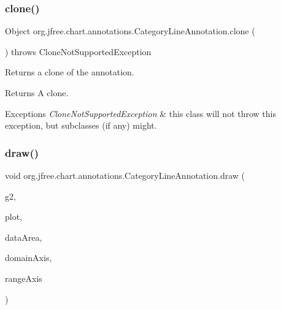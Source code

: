 \subsubsection{\texorpdfstring{clone()}{clone()}}
{\footnotesize\ttfamily Object org.\+jfree.\+chart.\+annotations.\+Category\+Line\+Annotation.\+clone (\begin{DoxyParamCaption}{ }\end{DoxyParamCaption}) throws Clone\+Not\+Supported\+Exception}

Returns a clone of the annotation.

\begin{DoxyReturn}{Returns}
A clone.
\end{DoxyReturn}

\begin{DoxyExceptions}{Exceptions}
{\em Clone\+Not\+Supported\+Exception} & this class will not throw this exception, but subclasses (if any) might. \\
\hline
\end{DoxyExceptions}
\mbox{\label{classorg_1_1jfree_1_1chart_1_1annotations_1_1_category_line_annotation_af5d6ed4dc7fef3a18edf94c0cce35663}} 
\subsubsection{\texorpdfstring{draw()}{draw()}}
{\footnotesize\ttfamily void org.\+jfree.\+chart.\+annotations.\+Category\+Line\+Annotation.\+draw (\begin{DoxyParamCaption}\item[{Graphics2D}]{g2,  }\item[{\mbox{\hyperlink{classorg_1_1jfree_1_1chart_1_1plot_1_1_category_plot}{Category\+Plot}}}]{plot,  }\item[{Rectangle2D}]{data\+Area,  }\item[{\mbox{\hyperlink{classorg_1_1jfree_1_1chart_1_1axis_1_1_category_axis}{Category\+Axis}}}]{domain\+Axis,  }\item[{\mbox{\hyperlink{classorg_1_1jfree_1_1chart_1_1axis_1_1_value_axis}{Value\+Axis}}}]{range\+Axis }\end{DoxyParamCaption})}

